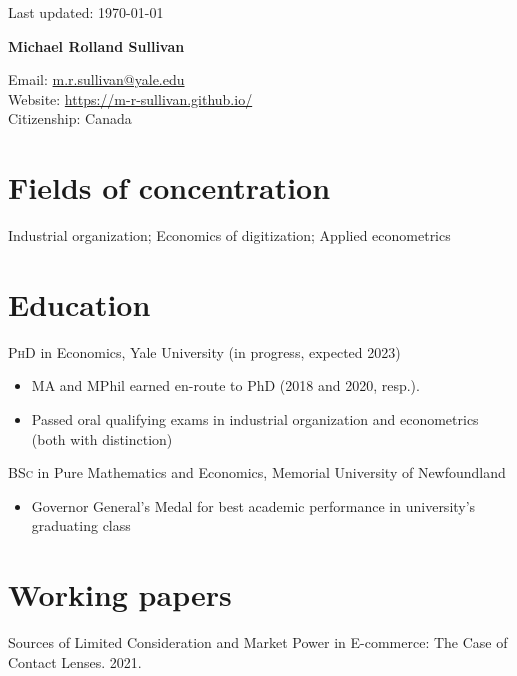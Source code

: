 \documentclass[11pt]{article} %
\begin{document}
 \begin{flushright}
   \scriptsize
	Last updated: \today
   \normalsize
\end{flushright}
{\LARGE\bfseries Michael Rolland Sullivan} %
\bigskip\bigskip\medskip %

\medskip %

Email: \href{mailto:m.r.sullivan@yale.edu}{m.r.sullivan@yale.edu}\\ 
Website: \href{https://m-r-sullivan.github.io/}{https://m-r-sullivan.github.io/}\\ 

Citizenship: Canada 

\section*{Fields of concentration}

Industrial organization; Economics of digitization; Applied econometrics 

\section*{Education}

\textsc{PhD} in Economics, Yale University (in progress, expected 2023)
\begin{itemize}
	\item MA and MPhil earned en-route to PhD (2018 and 2020, resp.).
	\item Passed oral qualifying exams in industrial organization and econometrics (both with distinction)
\end{itemize}

\textsc{BSc} in Pure Mathematics and Economics, Memorial University of Newfoundland
\begin{itemize}
	\item Governor General's Medal for best academic performance in university's graduating class
\end{itemize}

\section*{Working papers}

Sources of Limited Consideration and Market Power in E-commerce: The Case of
Contact Lenses. 2021.
\end{document}

